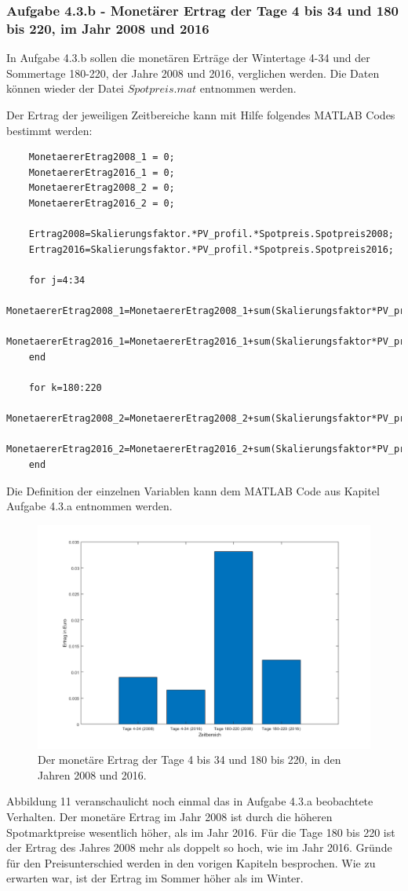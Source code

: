 \documentclass[a4paper,12pt]{article}
\begin{document}
	\subsubsection{Aufgabe 4.3.b - Monetärer Ertrag der Tage 4 bis 34 und 180 bis 220, im Jahr 2008 und 2016}
	In Aufgabe 4.3.b sollen die monetären Erträge der Wintertage 4-34 und der Sommertage 180-220, der Jahre 2008 und 2016, verglichen werden.\newline
	Die Daten können wieder der Datei $Spotpreis.mat$ entnommen werden.\\ \par
	Der Ertrag der jeweiligen Zeitbereiche kann mit Hilfe folgendes MATLAB Codes bestimmt werden:
	\begin{lstlisting}
	MonetaererEtrag2008_1 = 0;
	MonetaererEtrag2016_1 = 0;
	MonetaererEtrag2008_2 = 0;
	MonetaererEtrag2016_2 = 0;
	
	Ertrag2008=Skalierungsfaktor.*PV_profil.*Spotpreis.Spotpreis2008;
	Ertrag2016=Skalierungsfaktor.*PV_profil.*Spotpreis.Spotpreis2016;
	
	for j=4:34
		MonetaererEtrag2008_1=MonetaererEtrag2008_1+sum(Skalierungsfaktor*PV_profil(j)*Spotpreis.Spotpreis2008(j));
		MonetaererEtrag2016_1=MonetaererEtrag2016_1+sum(Skalierungsfaktor*PV_profil(j)*Spotpreis.Spotpreis2016(j));
	end
	
	for k=180:220
		MonetaererEtrag2008_2=MonetaererEtrag2008_2+sum(Skalierungsfaktor*PV_profil(k)*Spotpreis.Spotpreis2008(k));
		MonetaererEtrag2016_2=MonetaererEtrag2016_2+sum(Skalierungsfaktor*PV_profil(k)*Spotpreis.Spotpreis2016(k));
	end
	\end{lstlisting}
	Die Definition der einzelnen Variablen kann dem MATLAB Code aus Kapitel Aufgabe 4.3.a entnommen werden.
	\begin{figure}[H]
		\centering
		\includegraphics[width=12cm]{img/results/ErtragEinzelnerTage}
		\caption{Der monetäre Ertrag der Tage 4 bis 34 und 180 bis 220, in den Jahren 2008 und 2016.}
	\end{figure}
	\noindent Abbildung 11 veranschaulicht noch einmal das in Aufgabe 4.3.a beobachtete Verhalten. Der monetäre Ertrag im Jahr 2008 ist durch die höheren Spotmarktpreise wesentlich höher, als im Jahr 2016. Für die Tage 180 bis 220 ist der Ertrag des Jahres 2008 mehr als doppelt so hoch, wie im Jahr 2016. Gründe für den Preisunterschied werden in den vorigen Kapiteln besprochen.\newline
	Wie zu erwarten war, ist der Ertrag im Sommer höher als im Winter.
	\newpage
	\listoffigures
	
\end{document}
